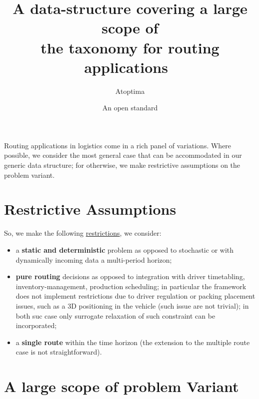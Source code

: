 \documentclass[12pt,a4paper]{article}
\title{A data-structure covering a large scope of \\ the taxonomy for routing applications}
\author{Atoptima}
\date{An open standard}
\begin{document}
\maketitle

Routing applications in logistics come in a rich panel of variations. Where possible, we consider the most general case that can be accommodated in our generic data structure; for otherwise, we make restrictive assumptions on the problem variant. \\

\section{Restrictive Assumptions}

\noindent So, we make the following \underline{restrictions}, we consider:
\begin{itemize}
\item a {\bf static and deterministic} problem as opposed to stochastic or with dynamically incoming data a multi-period horizon;
\item {\bf pure routing} decisions as opposed to integration with driver timetabling, inventory-management, production scheduling; in particular the framework does not implement restrictions due to driver regulation or packing placement issues, such as  a 3D positioning in the vehicle (such issue are not trivial); in both suc case only surrogate relaxation of such constraint can be incorporated;
\item a {\bf single route} within the time horizon (the extension to the multiple route case is not straightforward).
\end{itemize}

\section{A large scope of problem Variant}
\end{document}
